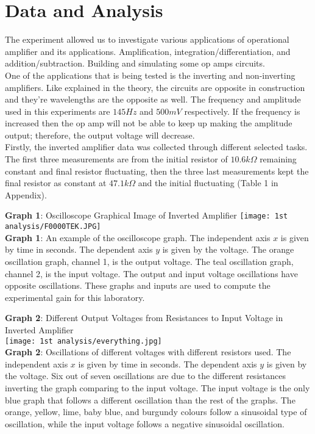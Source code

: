\documentclass[11pt]{article}
\begin{document}
\section*{Data and Analysis}
The experiment allowed us to investigate various applications of operational amplifier and its applications. Amplification, integration/differentiation, and addition/subtraction. Building and simulating some op amps circuits. \\
One of the applications that is being tested is the inverting and non-inverting amplifiers. Like explained in the theory, the circuits are opposite in construction and they're wavelengths are the opposite as well. The frequency and amplitude used in this experiments are $145 Hz$ and $500 mV$ respectively. If the frequency is increased then the op amp will not be able to keep up making the amplitude output; therefore, the output voltage will decrease.\\
Firstly, the inverted amplifier data was collected through different selected tasks. The first three measurements are from the initial resistor of $10.6 k\Omega$ remaining constant and final resistor fluctuating, then the three last measurements kept the final resistor as constant at $47.1 k\Omega$ and the initial fluctuating (Table 1 in Appendix). 
\begin{center}
    \textbf{Graph 1}: Oscilloscope Graphical Image of Inverted Amplifier
    \texttt{[image: 1st analysis/F0000TEK.JPG]}\\\textbf{Graph 1}: An example of the oscilloscope graph. The independent axis $x$ is given by time in seconds. The dependent axis $y$ is given by the voltage. The orange oscillation graph, channel 1, is the output voltage. The teal oscillation graph, channel 2, is the input voltage. The output and input voltage oscillations have opposite oscillations. These graphs and inputs are used to compute the experimental gain for this laboratory. 
\end{center}
\newpage
\begin{center}
    \textbf{Graph 2}: Different Output Voltages from Resistances to Input Voltage in Inverted Amplifier\\
    \texttt{[image: 1st analysis/everything.jpg]}\\\textbf{Graph 2}: Oscillations of different voltages with different resistors used. The independent axis $x$ is given by time in seconds. The dependent axis $y$ is given by the voltage. Six out of seven oscillations are due to the different resistances inverting the graph comparing to the input voltage. The input voltage is the only blue graph that follows a different oscillation than the rest of the graphs. The orange, yellow, lime, baby blue, and burgundy colours follow a sinusoidal type of oscillation, while the input voltage follows a negative sinusoidal oscillation. 
\end{center}
\end{document}
